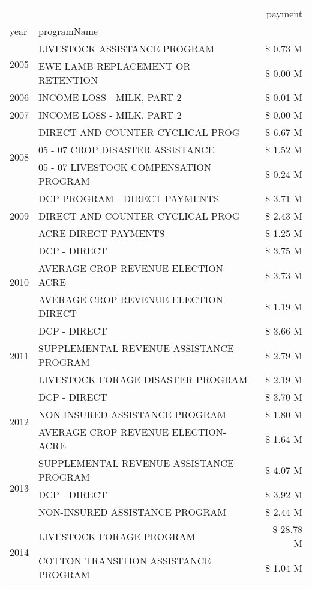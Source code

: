 \begin{tabular}{llr}
\toprule
 &  & payment \\
year & programName &  \\
\midrule
\multirow[t]{2}{*}{2005} & LIVESTOCK ASSISTANCE PROGRAM & \$ 0.73 M \\
 & EWE LAMB REPLACEMENT OR RETENTION & \$ 0.00 M \\
\cline{1-3}
2006 & INCOME LOSS - MILK, PART 2 & \$ 0.01 M \\
\cline{1-3}
2007 & INCOME LOSS - MILK, PART 2 & \$ 0.00 M \\
\cline{1-3}
\multirow[t]{3}{*}{2008} & DIRECT AND COUNTER CYCLICAL PROG & \$ 6.67 M \\
 & 05 - 07 CROP DISASTER ASSISTANCE & \$ 1.52 M \\
 & 05 - 07 LIVESTOCK COMPENSATION PROGRAM & \$ 0.24 M \\
\cline{1-3}
\multirow[t]{3}{*}{2009} & DCP PROGRAM - DIRECT PAYMENTS & \$ 3.71 M \\
 & DIRECT AND COUNTER CYCLICAL PROG & \$ 2.43 M \\
 & ACRE DIRECT PAYMENTS & \$ 1.25 M \\
\cline{1-3}
\multirow[t]{3}{*}{2010} & DCP - DIRECT & \$ 3.75 M \\
 & AVERAGE CROP REVENUE ELECTION-ACRE & \$ 3.73 M \\
 & AVERAGE CROP REVENUE ELECTION-DIRECT & \$ 1.19 M \\
\cline{1-3}
\multirow[t]{3}{*}{2011} & DCP - DIRECT & \$ 3.66 M \\
 & SUPPLEMENTAL REVENUE ASSISTANCE PROGRAM & \$ 2.79 M \\
 & LIVESTOCK FORAGE DISASTER PROGRAM & \$ 2.19 M \\
\cline{1-3}
\multirow[t]{3}{*}{2012} & DCP - DIRECT & \$ 3.70 M \\
 & NON-INSURED ASSISTANCE PROGRAM & \$ 1.80 M \\
 & AVERAGE CROP REVENUE ELECTION-ACRE & \$ 1.64 M \\
\cline{1-3}
\multirow[t]{3}{*}{2013} & SUPPLEMENTAL REVENUE ASSISTANCE PROGRAM & \$ 4.07 M \\
 & DCP - DIRECT & \$ 3.92 M \\
 & NON-INSURED ASSISTANCE PROGRAM & \$ 2.44 M \\
\cline{1-3}
\multirow[t]{3}{*}{2014} & LIVESTOCK FORAGE PROGRAM & \$ 28.78 M \\
 & COTTON TRANSITION ASSISTANCE PROGRAM & \$ 1.04 M \\

\end{tabular}
